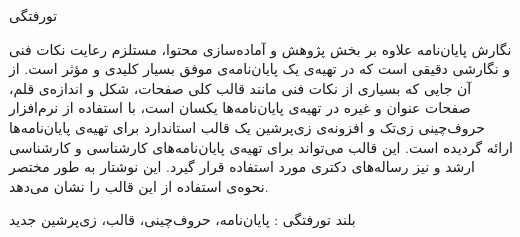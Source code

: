 


‌تورفتگی

نگارش پایان‌نامه‌ علاوه بر بخش پژوهش و آماده‌سازی محتوا،
مستلزم رعایت نکات فنی و نگارشی دقیقی است 
که در تهیه‌ی یک پایان‌نامه‌ی موفق بسیار کلیدی و مؤثر است.
از آن جایی که بسیاری از نکات فنی مانند قالب کلی صفحات، شکل و اندازه‌ی قلم، 
صفحات عنوان و غیره در تهیه‌ی پایان‌نامه‌ها یکسان است،
با استفاده از نرم‌افزار حروف‌چینی زی‌تک %
و افزونه‌ی زی‌پرشین %
یک قالب استاندارد برای تهیه‌ی پایان‌نامه‌ها ارائه گردیده است.
این قالب می‌تواند برای تهیه‌ی پایان‌نامه‌های
کارشناسی و کارشناسی ارشد و نیز رساله‌ها‌ی دکتری مورد استفاده قرار گیرد.
این نوشتار به طور مختصر نحوه‌ی استفاده از این قالب را نشان می‌دهد.

‌بلند
‌تورفتگی : 
پایان‌نامه، حروف‌چینی، قالب، زی‌پرشین
‌جدید
